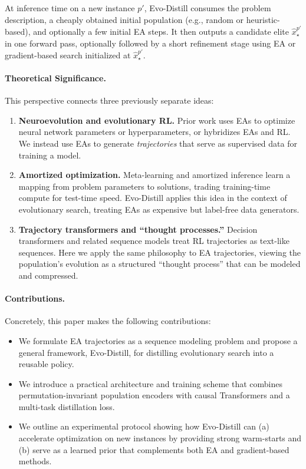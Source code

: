 \documentclass{article}
\begin{document}
At inference time on a new instance $p'$, Evo-Distill consumes the problem description, a cheaply obtained initial population (e.g., random or heuristic-based), and optionally a few initial EA steps. It then outputs a candidate elite $\hat{x}_\star^{p'}$ in one forward pass, optionally followed by a short refinement stage using EA or gradient-based search initialized at $\hat{x}_\star^{p'}$.

\paragraph{Theoretical Significance.}
This perspective connects three previously separate ideas:
\begin{enumerate}
    \item \textbf{Neuroevolution and evolutionary RL.} Prior work uses EAs to optimize neural network parameters or hyperparameters, or hybridizes EAs and RL. We instead use EAs to generate \emph{trajectories} that serve as supervised data for training a model.
    \item \textbf{Amortized optimization.} Meta-learning and amortized inference learn a mapping from problem parameters to solutions, trading training-time compute for test-time speed. Evo-Distill applies this idea in the context of evolutionary search, treating EAs as expensive but label-free data generators.
    \item \textbf{Trajectory transformers and ``thought processes.''} Decision transformers and related sequence models treat RL trajectories as text-like sequences. Here we apply the same philosophy to EA trajectories, viewing the population's evolution as a structured ``thought process'' that can be modeled and compressed.
\end{enumerate}

\paragraph{Contributions.}
Concretely, this paper makes the following contributions:
\begin{itemize}
    \item We formulate EA trajectories as a sequence modeling problem and propose a general framework, Evo-Distill, for distilling evolutionary search into a reusable policy.
    \item We introduce a practical architecture and training scheme that combines permutation-invariant population encoders with causal Transformers and a multi-task distillation loss.
    \item We outline an experimental protocol showing how Evo-Distill can (a) accelerate optimization on new instances by providing strong warm-starts and (b) serve as a learned prior that complements both EA and gradient-based methods.
\end{itemize}
\end{document}
